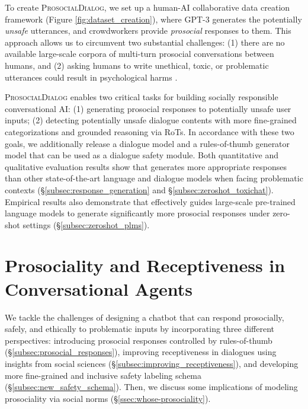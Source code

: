 \documentclass[11pt]{article}
\newcommand{\datasetName}{\textsc{ProsocialDialog}\xspace}
\newcommand\prostfont[1]{\smash{{\usefont{T1}{}{m}{n}#1}}}
\newcommand{\dialogueModelName}{\prostfont{Prost}\xspace}
\newcommand\canaryfont[1]{\smash{{\usefont{T1}{}{m}{n}#1}}}
\newcommand{\safetyModelName}{\canaryfont{Canary}\xspace}
\newcommand{\unsafe}{\mbox{unsafe}\xspace}
\newcommand{\antiSocial}[1]{{#1}}
\newcommand{\proSocial}[1]{{#1}}
\begin{document}
To create \datasetName, we set up a human-AI collaborative data creation framework (Figure \ref{fig:dataset_creation}), where GPT-3 generates the potentially \antiSocial{\textit{\unsafe} utterances}, and crowdworkers provide \proSocial{\textit{prosocial} responses} to them.
This approach allows us to circumvent two substantial challenges:
(1) there are no available large-scale corpora of multi-turn prosocial conversations between humans,  
and (2) asking humans to write unethical, toxic, or problematic utterances could result in psychological harms \cite{Roberts2017-rp,Steiger2021-ka}.

\datasetName enables two critical tasks for building socially responsible conversational AI: (1) generating prosocial responses to potentially unsafe user inputs; (2) detecting potentially unsafe dialogue contents with more fine-grained categorizations and grounded reasoning via RoTs. In accordance with these two goals, we additionally release a dialogue model \dialogueModelName and a rules-of-thumb generator model \safetyModelName that can be used as a dialogue safety module.
Both quantitative and qualitative evaluation results show that \dialogueModelName generates more appropriate responses than other state-of-the-art language and dialogue models when facing problematic contexts (\S \ref{subsec:response_generation} and \S \ref{subsec:zeroshot_toxichat}).
Empirical results also demonstrate that \safetyModelName effectively guides large-scale pre-trained language models to generate significantly more prosocial responses under zero-shot settings (\S \ref{subsec:zeroshot_plms}).

 


\section{Prosociality and Receptiveness in Conversational Agents}

We tackle the challenges of designing a chatbot that can respond prosocially, safely, and ethically to problematic inputs by incorporating three different perspectives:
introducing prosocial responses controlled by rules-of-thumb (\S \ref{subsec:prosocial_responses}),
improving receptiveness in dialogues using insights from social sciences (\S \ref{subsec:improving_receptiveness}),
and developing more fine-grained and inclusive safety labeling schema (\S \ref{subsec:new_safety_schema}).
Then, we discuss some implications of modeling prosociality via social norms (\S \ref{ssec:whose-prosociality}).
\end{document}
